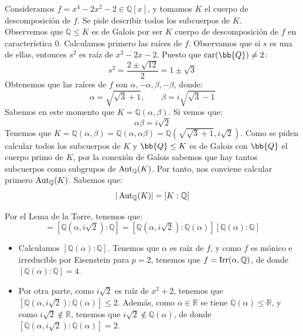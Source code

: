 \begin{ejemplo}
    Consideramos $f = x^4-2x^2-2\in \mathbb{Q}[x]$, y tomamos $K$ el cuerpo de descomposición de $f$. Se pide describir todos los subcuerpos de $K$.\\

    \noindent
    Observemos que $\mathbb{Q}\leq K$ es de Galois por ser $K$ cuerpo de descomposición de $f$ en característica $0$. Calculamos primero las raíces de $f$. Observamos que si $s$ es una de ellas, entonces $s^2$ es raíz de $x^2-2x-2$. Puesto que $\car(\bb{Q})\neq 2$:
    \begin{equation*}
        s^2 = \frac{2\pm \sqrt{12}}{2} = 1\pm \sqrt{3}
    \end{equation*}
    Obtenemos que las raíces de $f$ son $\alpha,-\alpha,\beta,-\beta$, donde:
    \begin{equation*}
        \alpha = \sqrt{\sqrt{3}+1}, \qquad \beta = i\sqrt{\sqrt{3}-1}
    \end{equation*}
    Sabemos en este momento que $K = \mathbb{Q}(\alpha,\beta)$. Si vemos que:
    \begin{equation*}
        \alpha\beta = i\sqrt{2}
    \end{equation*}
    Tenemos que $K = \mathbb{Q}(\alpha,\beta) = \mathbb{Q}(\alpha,\alpha\beta) = \mathbb{Q}\left(\sqrt{\sqrt{3}+1}, i\sqrt{2}\right)$. Como se piden calcular todos los subcuerpos de $K$ y $\bb{Q}\leq K$ es de Galois con $\bb{Q}$ el cuerpo primo de $K$, por la conexión de Galois sabemos que hay tantos subcuerpos como subgrupos de $\operatorname{Aut}_\mathbb{Q}(K)$. Por tanto, nos conviene calcular primero $\operatorname{Aut}_\mathbb{Q}(K)$. Sabemos que:
    \begin{equation*}
        |\operatorname{Aut}_\mathbb{Q}(K)| = [K:\mathbb{Q}]
    \end{equation*}

    Por el Lema de la Torre, tenemos que:
    \begin{equation*}
        [K:\mathbb{Q}] = \left[\mathbb{Q}\left(\alpha,i\sqrt{2}\right):\mathbb{Q}\right] = \left[\mathbb{Q}\left(\alpha,i\sqrt{2}\right):\mathbb{Q}(\alpha)\right]\left[\mathbb{Q}(\alpha):\mathbb{Q}\right]
    \end{equation*}
    \begin{itemize}
        \item Calculamos $[\mathbb{Q}(\alpha):\mathbb{Q}]$. Tenemos que $\alpha$ es raíz de $f$, y como $f$ es mónico e irreducible por Eisenstein para $p=2$, tenemos que $f = \operatorname{Irr}(\alpha,\mathbb{Q})$, de donde $[\mathbb{Q}(\alpha):\mathbb{Q}] = 4$.
        \item Por otra parte, como $i\sqrt{2}$ es raíz de $x^2+2$, tenemos que $[\mathbb{Q}\left(\alpha,i\sqrt{2}\right):\mathbb{Q}(\alpha)]\leq 2$. Además, como $\alpha\in \mathbb{R}$ se tiene $\mathbb{Q}(\alpha)\leq \mathbb{R}$, y como $i\sqrt{2}\notin \mathbb{R}$, tenemos que $i\sqrt{2}\notin \mathbb{Q}(\alpha)$, de donde $[\mathbb{Q}\left(\alpha,i\sqrt{2}\right):\mathbb{Q}(\alpha)] = 2$.
        

\end{itemize}
\end{ejemplo}
